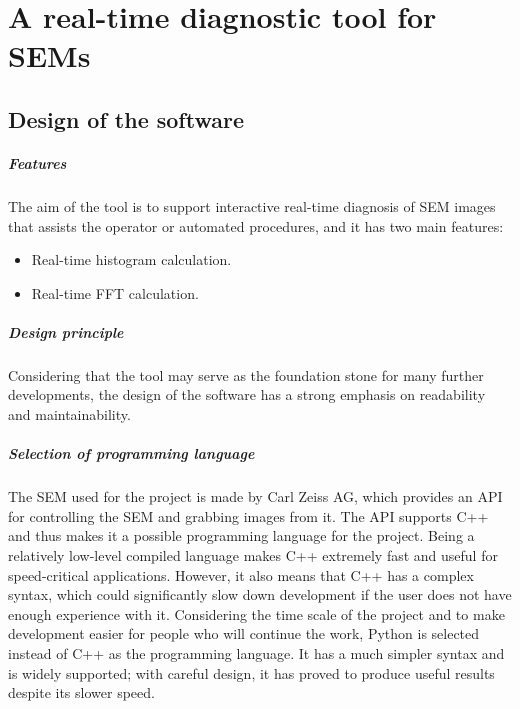 \documentclass[12pt, twocolumn]{report}
\begin{document}
\chapter{A real-time diagnostic tool for SEMs}
\section{Design of the software}
\paragraph{Features}
The aim of the tool is to support interactive real-time diagnosis of SEM images that assists the operator or automated procedures, and it has two main features:
\begin{itemize}
    \item Real-time histogram calculation.
    \item Real-time FFT calculation.
\end{itemize}

\paragraph{Design principle}
Considering that the tool may serve as the foundation stone for many further developments, the design of the software has a strong emphasis on readability and maintainability.

\paragraph{Selection of programming language}
The SEM used for the project is made by Carl Zeiss AG, which provides an API for controlling the SEM and grabbing images from it. The API supports C++ and thus makes it a possible programming language for the project. Being a relatively low-level compiled language makes C++ extremely fast and useful for speed-critical applications. However, it also means that C++ has a complex syntax, which could significantly slow down development if the user does not have enough experience with it. Considering the time scale of the project and to make development easier for people who will continue the work, Python is selected instead of C++ as the programming language. It has a much simpler syntax and is widely supported; with careful design, it has proved to produce useful results despite its slower speed.
\end{document}
